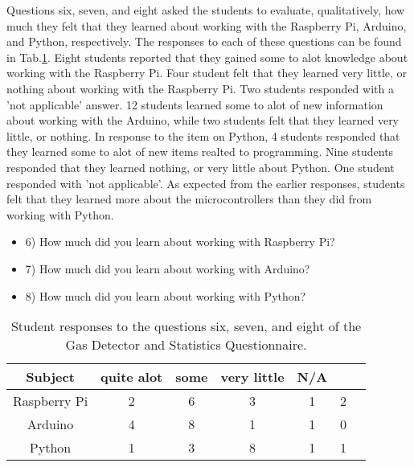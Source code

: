 Questions six, seven, and eight asked the students to evaluate, qualitatively, how much they felt that they learned about working with the Raspberry Pi, Arduino, and Python, respectively.
The responses to each of these questions can be found in Tab.\ref{tab:t7q678}.
Eight students reported that they gained some to alot knowledge about working with the Raspberry Pi.
Four student felt that they learned very little, or nothing about working with the Raspberry Pi.
Two students responded with a 'not applicable' answer.
12 students learned some to alot of new information about working with the Arduino, while two students felt that they learned very little, or nothing.
In response to the item on Python, 4 students responded that they learned some to alot of new items realted to programming.
Nine students responded that they learned nothing, or very little about Python.
One student responded with 'not applicable'.
As expected from the earlier responses, students felt that they learned more about the microcontrollers than they did from working with Python.


\begin{table}[htpb]
  \scriptsize
  \begin{center}
    \caption{\scriptsize Student responses to the questions six, seven, and eight of the Gas Detector and Statistics Questionnaire.}
    \label{tab:t7q678}
    \begin{itemize}
    \item 6) How much did you learn about working with Raspberry Pi?
    \item 7) How much did you learn about working with Arduino?
    \item 8) How much did you learn about working with Python?
      
    \end{itemize}
    

    \begin{tabular}{|c | c | c | c | c | c | c|}
      \hline
      Subject & quite alot & some & very little & N/A\\
      \hline
      Raspberry Pi & 2 & 6 & 3 & 1 & 2 \\
      \hline
      Arduino & 4 & 8 & 1 & 1 & 0 \\
      \hline
      Python & 1 & 3 & 8 & 1 & 1 \\
      \hline
    \end{tabular}
  \end{center}%
\end{table}





